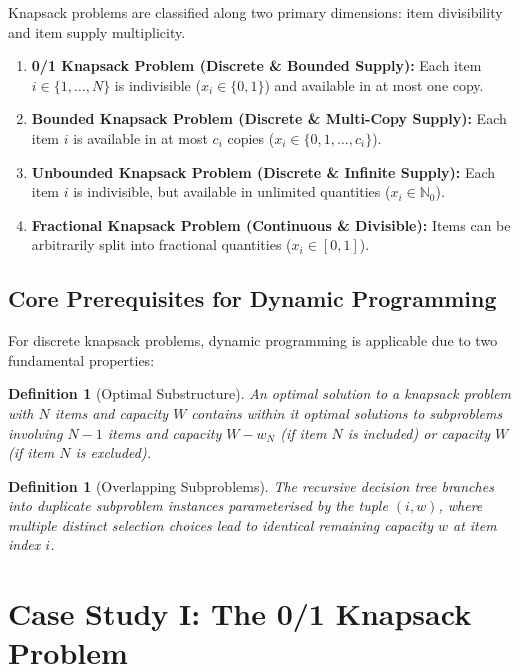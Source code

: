\documentclass[10pt,journal,compsoc,onecolumn]{IEEEtran}
\newtheorem{definition}[theorem]{Definition}
\begin{document}
Knapsack problems are classified along two primary dimensions: item divisibility and item supply multiplicity.

\begin{enumerate}
    \item \textbf{0/1 Knapsack Problem (Discrete \& Bounded Supply):} Each item $i \in \{1, \dots, N\}$ is indivisible ($x_i \in \{0, 1\}$) and available in at most one copy.
    \item \textbf{Bounded Knapsack Problem (Discrete \& Multi-Copy Supply):} Each item $i$ is available in at most $c_i$ copies ($x_i \in \{0, 1, \dots, c_i\}$).
    \item \textbf{Unbounded Knapsack Problem (Discrete \& Infinite Supply):} Each item $i$ is indivisible, but available in unlimited quantities ($x_i \in \mathbb{N}_0$).
    \item \textbf{Fractional Knapsack Problem (Continuous \& Divisible):} Items can be arbitrarily split into fractional quantities ($x_i \in [0, 1]$).
\end{enumerate}

\subsection{Core Prerequisites for Dynamic Programming}

For discrete knapsack problems, dynamic programming is applicable due to two fundamental properties:

\begin{definition}[Optimal Substructure]
An optimal solution to a knapsack problem with $N$ items and capacity $W$ contains within it optimal solutions to subproblems involving $N-1$ items and capacity $W - w_N$ (if item $N$ is included) or capacity $W$ (if item $N$ is excluded).
\end{definition}

\begin{definition}[Overlapping Subproblems]
The recursive decision tree branches into duplicate subproblem instances parameterised by the tuple $(i, w)$, where multiple distinct selection choices lead to identical remaining capacity $w$ at item index $i$.
\end{definition}


\section{Case Study I: The 0/1 Knapsack Problem}
\label{sec:01-knapsack}
\end{document}
